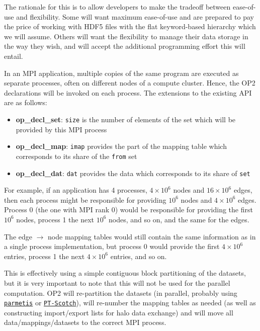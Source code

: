 \documentclass[11pt]{article}
\begin{document}
The rationale for this is to allow developers to make the tradeoff between 
ease-of-use and flexibility.  Some will want maximum ease-of-use and are prepared 
to pay the price of working with HDF5 files with the flat keyword-based hierarchy
which we will assume.  Others will want the flexibility 
to manage their data storage in the way they wish, and will accept the additional
programming effort this will entail.

In an MPI application, multiple copies of the same program are executed as
separate processes, often on different nodes of a compute cluster.  Hence, the 
OP2 declarations will be invoked on each process.  The extensions to the existing 
API are as follows:
\begin{itemize}
\item {\bf op\_decl\_set}: {\tt size} is the number of elements of the set which
will be provided by this MPI process

\item {\bf op\_decl\_map}: {\tt imap} provides the part of the mapping table 
which corresponds to its share of the {\tt from} set

\item {\bf op\_decl\_dat}: {\tt dat} provides the data which corresponds to its 
share of {\tt set}
\end{itemize}

For example, if an application has 4 processes, $4\!\times\! 10^6$ nodes and 
$16 \!\times\! 10^6$ edges, then each process might be responsible for providing
$10^6$ nodes and $4\!\times\! 10^6$ edges. Process 0 (the one with MPI rank 0)
would be responsible for providing the first $10^6$ nodes, process 1 the 
next $10^6$ nodes, and so on, and the same for the edges.

The edge $\rightarrow$ node mapping tables would still contain the same 
information as in a single process implementation, but process 0 would provide
the first $4\!\times\! 10^6$ entries, process 1 the next $4\!\times\! 10^6$ entries, 
and so on.

This is effectively using a simple contiguous block partitioning of the datasets, 
but it is very important to note that this will not be used for the parallel 
computation.  OP2 will re-partition the datasets (in parallel, probably using 
\href{http://glaros.dtc.umn.edu/gkhome/metis/parmetis/overview}{\tt parmetis} or
\href{http://www.labri.fr/perso/pelegrin/scotch/}{\tt PT-Scotch}), 
will re-number the mapping tables as needed (as well as constructing import/export 
lists for halo data exchange) and will move all data/mappings/datasets to the 
correct MPI process.
\end{document}
